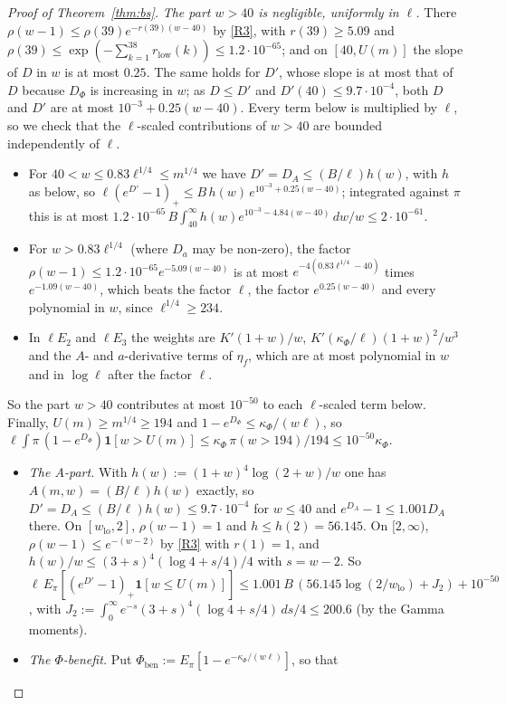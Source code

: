 \begin{proof}[Proof of Theorem~\ref{thm:bs}]
\emph{The part $w>40$ is negligible, uniformly in $\ell$.} There $\rho(w-1)\le\rho(39)e^{-r(39)(w-40)}$ by \ref{R3}, with
$r(39)\ge5.09$ and $\rho(39)\le\exp(-\sum_{k=1}^{38}r_{\mathrm{low}}(k))\le1.2\cdot10^{-65}$; and on $[40,U(m)]$ the slope of $D$
in $w$ is at most $0.25$. The same holds for $D'$, whose slope is at most that of $D$ because $D_\Phi$ is increasing in $w$;
as $D\le D'$ and $D'(40)\le9.7\cdot10^{-4}$, both $D$ and $D'$ are at most $10^{-3}+0.25(w-40)$. Every term below is multiplied by $\ell$, so we check that the
$\ell$-scaled contributions of $w>40$ are bounded independently of $\ell$.
\begin{itemize}
\item For $40<w\le0.83\ell^{1/4}\le m^{1/4}$ we have $D'=D_A\le(B/\ell)h(w)$, with $h$ as below, so
  $\ell(e^{D'}-1)_+\le B\,h(w)\,e^{10^{-3}+0.25(w-40)}$; integrated against $\pi$ this is at most
  $1.2\cdot10^{-65}\,B\int_{40}^\infty h(w)e^{10^{-3}-4.84(w-40)}\,dw/w\le2\cdot10^{-61}$.
\item For $w>0.83\ell^{1/4}$ (where $D_a$ may be non-zero), the factor
  $\rho(w-1)\le1.2\cdot10^{-65}e^{-5.09(w-40)}$ is at most $e^{-4(0.83\ell^{1/4}-40)}$ times $e^{-1.09(w-40)}$, which beats the
  factor $\ell$, the factor $e^{0.25(w-40)}$ and every polynomial in $w$, since $\ell^{1/4}\ge234$.
\item In $\ell E_2$ and $\ell E_3$ the weights are $K'(1+w)/w$, $K'(\kappa_\Phi/\ell)(1+w)^2/w^3$ and the
  $A$- and $a$-derivative terms of $\eta_f$, which are at most polynomial in $w$ and in $\log\ell$ after the factor $\ell$.
\end{itemize}
So the part $w>40$ contributes at most $10^{-50}$ to each $\ell$-scaled term below. Finally, $U(m)\ge m^{1/4}\ge194$ and
$1-e^{D_\Phi}\le\kappa_\Phi/(w\ell)$, so $\ell\int\pi\,(1-e^{D_\Phi})\mathbf 1[w>U(m)]\le\kappa_\Phi\,\pi(w>194)/194\le10^{-50}\kappa_\Phi$.
\begin{itemize}
\item \emph{The $A$-part.} With $h(w):=(1+w)^4\log(2+w)/w$ one has $A(m,w)=(B/\ell)h(w)$ exactly, so
  $D'=D_A\le(B/\ell)h(w)\le9.7\cdot10^{-4}$ for $w\le40$ and $e^{D_A}-1\le1.001D_A$ there. On $[w_{\mathrm{lo}},2]$, $\rho(w-1)=1$ and
  $h\le h(2)=56.145$. On $[2,\infty)$, $\rho(w-1)\le e^{-(w-2)}$ by \ref{R3} with $r(1)=1$, and $h(w)/w\le(3+s)^4(\log4+s/4)/4$
  with $s=w-2$. So $\ell\,E_\pi[(e^{D'}-1)_+\mathbf 1[w\le U(m)]]\le1.001\,B\,(56.145\log(2/w_{\mathrm{lo}})+J_2)+10^{-50}$, with
  $J_2:=\int_0^\infty e^{-s}(3+s)^4(\log4+s/4)\,ds/4\le200.6$ (by the Gamma moments).
\item \emph{The $\Phi$-benefit.} Put $\Phi_{\mathrm{ben}}:=E_\pi[1-e^{-\kappa_\Phi/(w\ell)}]$, so that

\end{itemize}
\end{proof}
